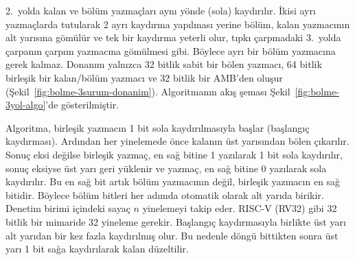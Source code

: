2.\ yolda kalan ve bölüm yazmaçları aynı yönde (sola) kaydırılır. İkisi ayrı yazmaçlarda tutularak 2 ayrı kaydırma yapılması yerine bölüm, kalan yazmacının alt yarısına gömülür ve tek bir kaydırma yeterli olur, tıpkı çarpmadaki 3.\ yolda çarpanın çarpım yazmacına gömülmesi gibi. Böylece ayrı bir bölüm yazmacına gerek kalmaz. Donanım yalnızca 32 bitlik sabit bir bölen yazmacı, 64 bitlik birleşik bir kalan/bölüm yazmacı ve 32 bitlik bir AMB'den oluşur (Şekil~\ref{fig:bolme-3surum-donanim}). Algoritmanın akış şeması Şekil~\ref{fig:bolme-3yol-algo}'de gösterilmiştir.

Algoritma, birleşik yazmacın 1 bit sola kaydırılmasıyla başlar (başlangıç kaydırması). Ardından her yinelemede önce kalanın üst yarısından bölen çıkarılır. Sonuç eksi değilse birleşik yazmaç, en sağ bitine 1 yazılarak 1 bit sola kaydırılır, sonuç eksiyse üst yarı geri yüklenir ve yazmaç, en sağ bitine 0 yazılarak sola kaydırılır. Bu en sağ bit artık bölüm yazmacının değil, birleşik yazmacın en sağ bitidir. Böylece bölüm bitleri her adımda otomatik olarak alt yarıda birikir. Denetim birimi içindeki sayaç $n$ yinelemeyi takip eder. RISC-V (RV32) gibi 32 bitlik bir mimaride 32 yineleme gerekir. Başlangıç kaydırmasıyla birlikte üst yarı alt yarıdan bir kez fazla kaydırılmış olur. Bu nedenle döngü bittikten sonra üst yarı 1 bit sağa kaydırılarak kalan düzeltilir.

